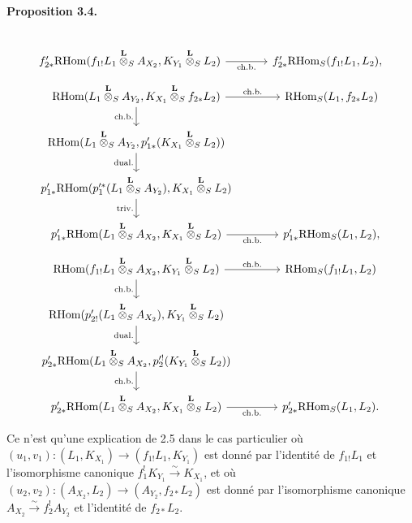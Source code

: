 \documentclass[11pt]{article}
\newenvironment{statement}[1]{\par\medskip\noindent\textbf{#1.}\ }{\par\medskip}
\providecommand{\RHom}{\mathrm{RHom}}
\providecommand{\RHom}{\mathrm{RHom}}
\begin{document}
\begin{statement}{Proposition 3.4}
\[\begin{tikzcd}[column sep=3.7em,row sep=1.7em]
& \\
f'_{2*}\RHom(f_{1!}L_1\overset{\mathbf L}{\otimes}_S A_{X_2},K_{Y_1}\overset{\mathbf L}{\otimes}_S L_2) \arrow[r,"\mathrm{ch.b.}"']
& f'_{2*}\RHom_S(f_{1!}L_1,L_2),
\end{tikzcd}
\]
\[
\begin{tikzcd}[column sep=3.7em,row sep=1.7em]
\RHom(L_1\overset{\mathbf L}{\otimes}_S A_{Y_2},K_{X_1}\overset{\mathbf L}{\otimes}_S f_{2*}L_2)
  \arrow[r,"\mathrm{ch.b.}"] \arrow[d,"\mathrm{ch.b.}"']
& \RHom_S(L_1,f_{2*}L_2)  \\
\RHom(L_1\overset{\mathbf L}{\otimes}_S A_{Y_2},p'_{1*}(K_{X_1}\overset{\mathbf L}{\otimes}_S L_2)) \arrow[d,"\mathrm{dual.}"']
& \\
p'_{1*}\RHom(p_1'^*(L_1\overset{\mathbf L}{\otimes}_S A_{Y_2}),K_{X_1}\overset{\mathbf L}{\otimes}_S L_2) \arrow[d,"\mathrm{triv.}"']
& \\
p'_{1*}\RHom(L_1\overset{\mathbf L}{\otimes}_S A_{X_2},K_{X_1}\overset{\mathbf L}{\otimes}_S L_2) \arrow[r,"\mathrm{ch.b.}"']
& p'_{1*}\RHom_S(L_1,L_2),
\end{tikzcd}
\]
\[
\begin{tikzcd}[column sep=3.7em,row sep=1.7em]
\RHom(f_{1!}L_1\overset{\mathbf L}{\otimes}_S A_{X_2},K_{Y_1}\overset{\mathbf L}{\otimes}_S L_2)
  \arrow[r,"\mathrm{ch.b.}"] \arrow[d,"\mathrm{ch.b.}"']
& \RHom_S(f_{1!}L_1,L_2)  \\
\RHom(p'_{2!}(L_1\overset{\mathbf L}{\otimes}_S A_{X_2}),K_{Y_1}\overset{\mathbf L}{\otimes}_S L_2) \arrow[d,"\mathrm{dual.}"']
& \\
p'_{2*}\RHom(L_1\overset{\mathbf L}{\otimes}_S A_{X_2},p_2'^!(K_{Y_1}\overset{\mathbf L}{\otimes}_S L_2)) \arrow[d,"\mathrm{ch.b.}"']
& \\
p'_{2*}\RHom(L_1\overset{\mathbf L}{\otimes}_S A_{X_2},K_{X_1}\overset{\mathbf L}{\otimes}_S L_2) \arrow[r,"\mathrm{ch.b.}"']
& p'_{2*}\RHom_S(L_1,L_2).
\end{tikzcd}
\]
\end{statement}
Ce n'est qu'une explication de 2.5 dans le cas particulier où $(u_1,v_1):(L_1,K_{X_1})\to(f_{1!}L_1,K_{Y_1})$ est donné par l'identité de $f_{1!}L_1$ et l'isomorphisme canonique $f_1^!K_{Y_1}\xrightarrow{\sim}K_{X_1}$, et où $(u_2,v_2):(A_{X_2},L_2)\to(A_{Y_2},f_{2*}L_2)$ est donné par l'isomorphisme canonique $A_{X_2}\xrightarrow{\sim}f_2^!A_{Y_2}$ et l'identité de $f_{2*}L_2$.
\end{document}
